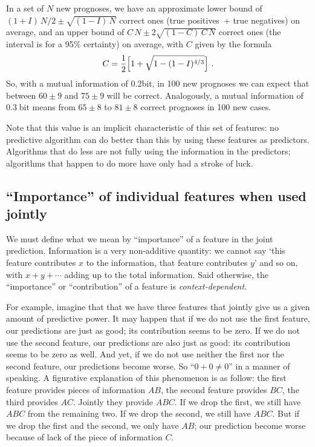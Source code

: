 \documentclass[\ifafour a4paper,12pt,\else a5paper,10pt,\fi%
onecolumn,oneside,article,%
british%
]{memoir}
\theoremstyle{remark}
\theoremstyle{innote}
\renewcommand*{\|}[1][]{\nonscript\:#1\vert\nonscript\:\mathopen{}}
\newcommand*{\bit}{\textrm{bit}}
\begin{document}
In a set of $N$ new prognoses, we have an approximate lower bound of
$(1+I)\,N/2 \pm \sqrt{(1-I)\,N}$ correct ones (true positives~+ true
negatives) on average, and an upper bound of $C\,N \pm 2\sqrt{(1-C)\,C\,N}$
correct ones (the interval is for a 95\% certainty) on average, with $C$
given by the formula
\begin{equation}
  \label{eq:mutualinfo_est}
 C = \frac{1}{2}\Bigl[1+\sqrt{1-(1-I)^{4/3}}\Bigr] \ .
\end{equation}
So, with a mutual information of 0.2\;\bit, in 100 new prognoses we can
expect  that between $60\pm 9$ and $75\pm 9$
will be correct. Analogously, a mutual information of $0.3\;\bit$ means
from $65 \pm 8$ to $81\pm 8$ correct prognoses in 100 new cases.

Note that this value is an implicit characteristic of this set of
features: no predictive algorithm can do better than this by using these
features as predictors. Algorithms that do less are not fully using the
information in the predictors; algorithms that happen to do more have only had a
stroke of luck.

\subsection{\enquote{Importance} of individual features when used jointly}
\label{sec:importance_features}

We must define what we mean by \enquote{importance} of a feature in the
joint prediction. Information is a very non-additive quantity: we cannot
say \enquote*{this feature contributes $x$ to the information, that feature
  contributes $y$} and so on, with $x+y+\dotsb$ adding up to the total
information. Said otherwise, the \enquote{importance} or
\enquote{contribution} of a feature is \emph{context-dependent}.

For example, imagine that that we have three features that jointly give us
a given amount of predictive power. It may happen that if we do not use the
first feature, our predictions are just as good; its contribution seems to
be zero. If we do not use the second feature, our predictions are also just
as good: its contribution seems to be zero as well. And yet, if we do not
use neither the first nor the second feature, our predictions become worse.
So \enquote{$0+0\ne 0$} in a manner of speaking. A figurative explanation
of this phenomenon is as follow: the first feature provides pieces of
information $AB$, the second feature provides $BC$, the third provides
$AC$. Jointly they provide $ABC$. If we drop the first, we still have $ABC$
from the remaining two. If we drop the second, we still have $ABC$. But if
we drop the first and the second, we only have $AB$; our prediction become
worse because of lack of the piece of information $C$.
\end{document}
